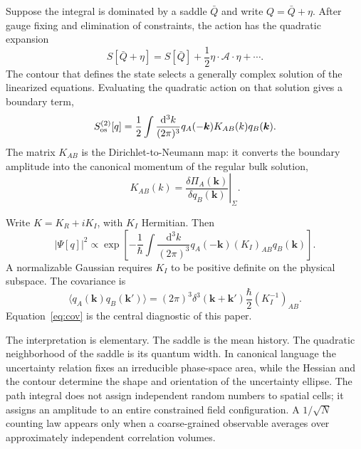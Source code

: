 \documentclass[aps,prd,twocolumn,superscriptaddress,nofootinbib,longbibliography]{revtex4-2}
\newcommand{\dd}{\mathrm d}
\begin{document}
Suppose the integral is dominated by a saddle $\bar Q$ and write $Q=\bar Q+\eta$. After gauge fixing and elimination of constraints, the action has the quadratic expansion
\begin{equation}
S[\bar Q+\eta]=S[\bar Q]+\frac12\eta\cdot\mathcal A\cdot\eta+\cdots .
\end{equation}
The contour that defines the state selects a generally complex solution of the linearized equations. Evaluating the quadratic action on that solution gives a boundary term,
\begin{equation}
S_{\rm os}^{(2)}[q]=\frac12\int\frac{\dd^3k}{(2\pi)^3}
q_A(-\bm k)K_{AB}(k)q_B(\bm k).
\label{eq:onshell}
\end{equation}
The matrix $K_{AB}$ is the Dirichlet-to-Neumann map: it converts the boundary amplitude into the canonical momentum of the regular bulk solution,
\begin{equation}
K_{AB}(k)=\left.\frac{\delta\Pi_A(\bm k)}{\delta q_B(\bm k)}\right|_\Sigma.
\end{equation}

Write $K=K_R+iK_I$, with $K_I$ Hermitian. Then
\begin{equation}
|\Psi[q]|^2\propto
\exp\left[-\frac1\hbar\int\frac{\dd^3k}{(2\pi)^3}
q_A(-\bm k)(K_I)_{AB}q_B(\bm k)\right].
\end{equation}
A normalizable Gaussian requires $K_I$ to be positive definite on the physical subspace. The covariance is
\begin{equation}
\langle q_A(\bm k)q_B(\bm k')\rangle
=(2\pi)^3\delta^3(\bm k+\bm k')\frac\hbar2(K_I^{-1})_{AB}.
\label{eq:cov}
\end{equation}
Equation~\eqref{eq:cov} is the central diagnostic of this paper.

The interpretation is elementary. The saddle is the mean history. The quadratic neighborhood of the saddle is its quantum width. In canonical language the uncertainty relation fixes an irreducible phase-space area, while the Hessian and the contour determine the shape and orientation of the uncertainty ellipse. The path integral does not assign independent random numbers to spatial cells; it assigns an amplitude to an entire constrained field configuration. A $1/\sqrt N$ counting law appears only when a coarse-grained observable averages over approximately independent correlation volumes.
\end{document}
